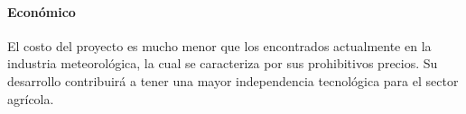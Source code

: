\documentclass[12pt,letterpaper]{article}
\begin{document}
\begin{sloppypar}
        \paragraph*{Económico}
        El costo del proyecto es mucho menor que los encontrados actualmente en la
        industria meteorológica,
        la cual se caracteriza por sus prohibitivos precios.
        Su desarrollo contribuirá a tener una mayor independencia tecnológica para el
        sector agrícola.

        \newpage
        
        

    \end{sloppypar}
\end{document}
